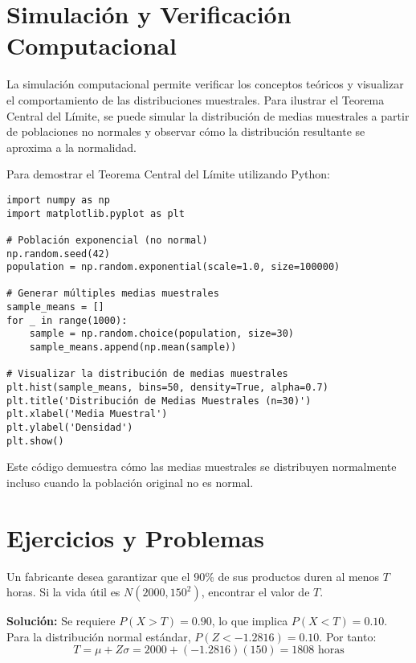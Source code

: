 \section{Simulación y Verificación Computacional}

\begin{remark}
La simulación computacional permite verificar los conceptos teóricos y visualizar el comportamiento de las distribuciones muestrales. Para ilustrar el Teorema Central del Límite, se puede simular la distribución de medias muestrales a partir de poblaciones no normales y observar cómo la distribución resultante se aproxima a la normalidad.
\end{remark}

\begin{example}
Para demostrar el Teorema Central del Límite utilizando Python:
\begin{verbatim}
import numpy as np
import matplotlib.pyplot as plt

# Población exponencial (no normal)
np.random.seed(42)
population = np.random.exponential(scale=1.0, size=100000)

# Generar múltiples medias muestrales
sample_means = []
for _ in range(1000):
    sample = np.random.choice(population, size=30)
    sample_means.append(np.mean(sample))

# Visualizar la distribución de medias muestrales
plt.hist(sample_means, bins=50, density=True, alpha=0.7)
plt.title('Distribución de Medias Muestrales (n=30)')
plt.xlabel('Media Muestral')
plt.ylabel('Densidad')
plt.show()
\end{verbatim}
Este código demuestra cómo las medias muestrales se distribuyen normalmente incluso cuando la población original no es normal.
\end{example}

\section{Ejercicios y Problemas}

\begin{example}
Un fabricante desea garantizar que el 90\% de sus productos duren al menos $T$ horas. Si la vida útil es $N(2000, 150^2)$, encontrar el valor de $T$.

\textbf{Solución:} Se requiere $P(X > T) = 0.90$, lo que implica $P(X < T) = 0.10$.
Para la distribución normal estándar, $P(Z < -1.2816) = 0.10$.
Por tanto:
\begin{equation}
T = \mu + Z\sigma = 2000 + (-1.2816)(150) = 1808 \text{ horas}
\end{equation}
\end{example}

